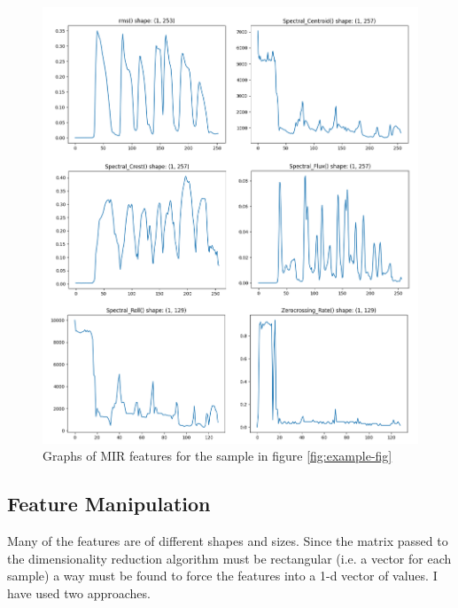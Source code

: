 \documentclass[11pt]{article}
\begin{document}
\begin{figure}[H]
\centering
\includegraphics[width=.7\linewidth]{./Figures/mir_features.png}
\caption{Graphs of MIR features for the sample in figure \ref{fig:example-fig}}
\end{figure}

\subsection{Feature Manipulation}
\label{sec:org694b75f}

Many of the features are of different shapes and sizes. Since the matrix passed to the dimensionality reduction algorithm must be rectangular (i.e. a vector for each sample) a way must be found to force the features into a 1-d vector of values. I have used two approaches.
\end{document}
